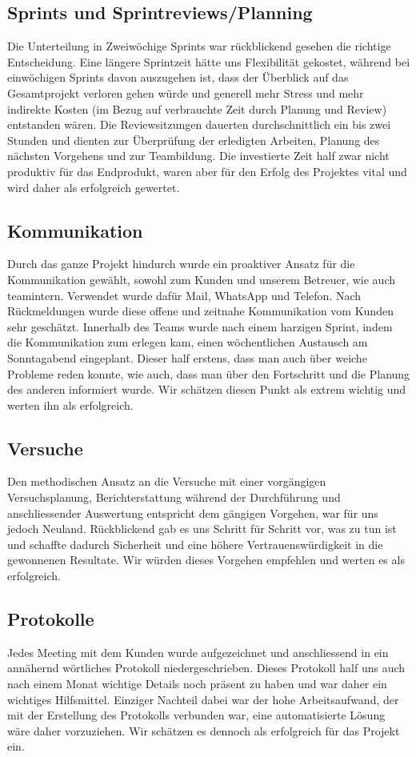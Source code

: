 \subsection{Sprints und Sprintreviews/Planning}
Die Unterteilung in Zweiwöchige Sprints war rückblickend gesehen die richtige Entscheidung. Eine längere Sprintzeit hätte uns Flexibilität gekostet, während bei einwöchigen Sprints davon auszugehen ist, dass der Überblick auf das Gesamtprojekt verloren gehen würde und generell mehr Stress und mehr indirekte Kosten (im Bezug auf verbrauchte Zeit durch Planung und Review) entstanden wären. Die Reviewsitzungen dauerten durchschnittlich ein bis zwei Stunden und dienten zur Überprüfung der erledigten Arbeiten, Planung des nächsten Vorgehens und zur Teambildung. Die investierte Zeit half zwar nicht produktiv für das Endprodukt, waren aber für den Erfolg des Projektes vital und wird daher als erfolgreich gewertet.

\subsection{Kommunikation}
Durch das ganze Projekt hindurch wurde ein proaktiver Ansatz für die Kommunikation gewählt, sowohl zum Kunden und unserem Betreuer, wie auch teamintern. Verwendet wurde dafür Mail, WhatsApp und Telefon. Nach Rückmeldungen wurde diese offene und zeitnahe Kommunikation vom Kunden sehr geschätzt. Innerhalb des Teams wurde nach einem harzigen Sprint, indem die Kommunikation zum erlegen kam, einen wöchentlichen Austausch am Sonntagabend eingeplant. Dieser half erstens, dass man auch über weiche Probleme reden konnte, wie auch, dass man über den Fortschritt und die Planung des anderen informiert wurde. Wir schätzen diesen Punkt als extrem wichtig und werten ihn als erfolgreich.

\subsection{Versuche}
Den methodischen Ansatz an die Versuche mit einer vorgängigen Versuchsplanung, Berichterstattung während der Durchführung und anschliessender Auswertung entspricht dem gängigen Vorgehen, war für uns jedoch Neuland. Rückblickend gab es uns Schritt für Schritt vor, was zu tun ist und schaffte dadurch Sicherheit und eine höhere Vertrauenswürdigkeit in die gewonnenen Resultate. Wir würden dieses Vorgehen empfehlen und werten es als erfolgreich.

\subsection{Protokolle}
Jedes Meeting mit dem Kunden wurde aufgezeichnet und anschliessend in ein annähernd wörtliches Protokoll niedergeschrieben. Dieses Protokoll half uns auch nach einem Monat wichtige Details noch präsent zu haben und war daher ein wichtiges Hilfsmittel. Einziger Nachteil dabei war der hohe Arbeitsaufwand, der mit der Erstellung des Protokolls verbunden war, eine automatisierte Lösung wäre daher vorzuziehen. Wir schätzen es dennoch als erfolgreich für das Projekt ein.
